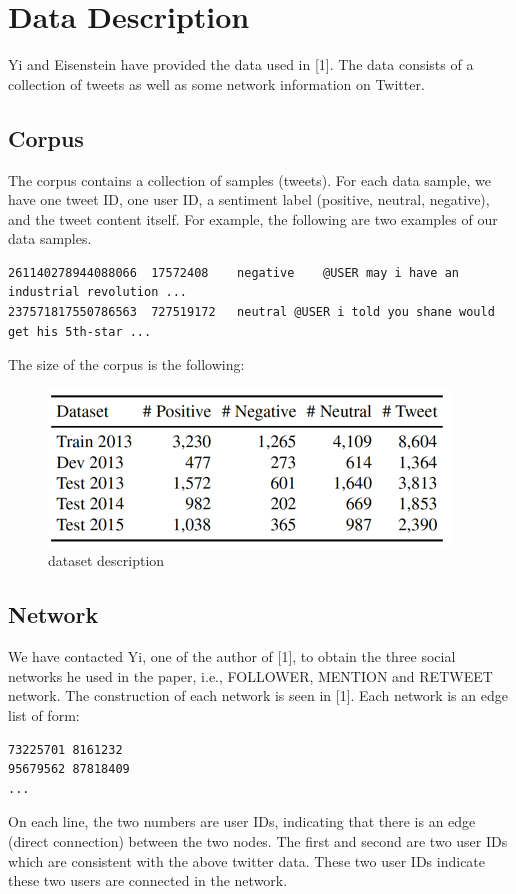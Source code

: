 
\section{Data Description}
\label{Sec:ProblemData}

Yi and Eisenstein have provided the data used in [1].
The data consists of a collection of tweets as well as some network information on Twitter.

\subsection{Corpus}
The corpus contains a collection of samples (tweets). 
For each data sample, we have one tweet ID, one user ID, a sentiment label (positive, neutral, negative), and the tweet content itself. For example, the following are two examples of our data samples.
\begin{verbatim}
261140278944088066	17572408	negative	@USER may i have an industrial revolution ...
237571817550786563	727519172	neutral	@USER i told you shane would get his 5th-star ...
\end{verbatim}

The size of the corpus is the following:
\begin{figure}[hbt]
\centering
  \includegraphics{Picture1.png}
  \caption{dataset description}
\end{figure}


\subsection{Network}
We have contacted Yi, one of the author of [1], to obtain the three social networks he used in the paper,
i.e.,
FOLLOWER, MENTION and RETWEET network. The construction of each network is seen in [1].
Each network is an edge list of form:
\begin{verbatim}
73225701 8161232
95679562 87818409
...
\end{verbatim}
On each line, the two numbers are user IDs, indicating that there is an edge (direct connection) between the two nodes.
The first and second are two user IDs which are consistent with the above twitter data. These two user IDs indicate these two users are connected in the network. 

